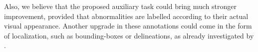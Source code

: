 \documentclass[11pt]{article}
\begin{document}
Also, we believe that the proposed auxiliary task could bring much stronger
improvement, provided that abnormalities are labelled according to their actual
visual appearance. Another upgrade in these annotations could come in the form
of localization, such as bounding-boxes or delineations, as already investigated by \autocite{tang19}.



\printbibliography
\end{document}
